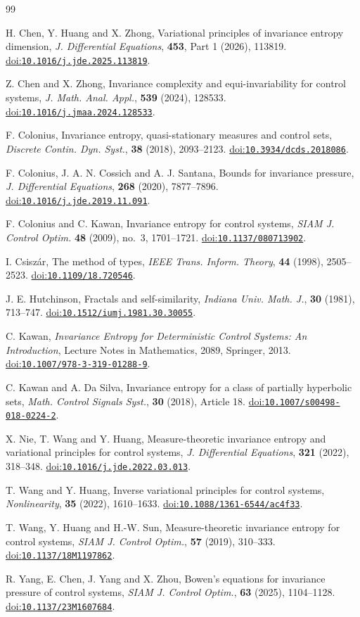 \documentclass[11pt]{amsart}
\theoremstyle{definition}
\theoremstyle{remark}
\newcommand{\doi}[1]{\href{https://doi.org/#1}{doi:\nolinkurl{#1}}}
\numberwithin{equation}{section}
\begin{document}
\begin{thebibliography}{99}
\raggedright
{}H. Chen, Y. Huang and X. Zhong,
Variational principles of invariance entropy dimension,
\emph{J. Differential Equations}, \textbf{453}, Part 1 (2026), 113819.
\doi{10.1016/j.jde.2025.113819}.

Z. Chen and X. Zhong,
Invariance complexity and equi-invariability for control systems,
\emph{J. Math. Anal. Appl.}, \textbf{539} (2024), 128533.
\doi{10.1016/j.jmaa.2024.128533}.

F. Colonius,
Invariance entropy, quasi-stationary measures and control sets,
\emph{Discrete Contin. Dyn. Syst.}, \textbf{38} (2018), 2093--2123.
\doi{10.3934/dcds.2018086}.

F. Colonius, J. A. N. Cossich and A. J. Santana,
Bounds for invariance pressure,
\emph{J. Differential Equations}, \textbf{268} (2020), 7877--7896.
\doi{10.1016/j.jde.2019.11.091}.

F. Colonius and C. Kawan,
Invariance entropy for control systems, \emph{SIAM J. Control Optim.} \textbf{48} (2009), no.~3, 1701--1721.
\href{https://doi.org/10.1137/080713902}{doi:\nolinkurl{10.1137/080713902}}.

I. Csisz\'ar,
The method of types,
\emph{IEEE Trans. Inform. Theory}, \textbf{44} (1998), 2505--2523.
\doi{10.1109/18.720546}.

J. E. Hutchinson,
Fractals and self-similarity,
\emph{Indiana Univ. Math. J.}, \textbf{30} (1981), 713--747.
\doi{10.1512/iumj.1981.30.30055}.

C. Kawan,
\emph{Invariance Entropy for Deterministic Control Systems:
An Introduction}, Lecture Notes in Mathematics, 2089,
Springer, 2013.
\doi{10.1007/978-3-319-01288-9}.

C. Kawan and A. Da Silva,
Invariance entropy for a class of partially hyperbolic sets,
\emph{Math. Control Signals Syst.}, \textbf{30} (2018), Article 18.
\doi{10.1007/s00498-018-0224-2}.

X. Nie, T. Wang and Y. Huang,
Measure-theoretic invariance entropy and variational principles
for control systems,
\emph{J. Differential Equations}, \textbf{321} (2022), 318--348.
\doi{10.1016/j.jde.2022.03.013}.

T. Wang and Y. Huang,
Inverse variational principles for control systems,
\emph{Nonlinearity}, \textbf{35} (2022), 1610--1633.
\doi{10.1088/1361-6544/ac4f33}.

T. Wang, Y. Huang and H.-W. Sun,
Measure-theoretic invariance entropy for control systems,
\emph{SIAM J. Control Optim.}, \textbf{57} (2019), 310--333.
\doi{10.1137/18M1197862}.

R. Yang, E. Chen, J. Yang and X. Zhou,
Bowen's equations for invariance pressure of control systems,
\emph{SIAM J. Control Optim.}, \textbf{63} (2025), 1104--1128.
\doi{10.1137/23M1607684}.

\end{thebibliography}
\end{document}
